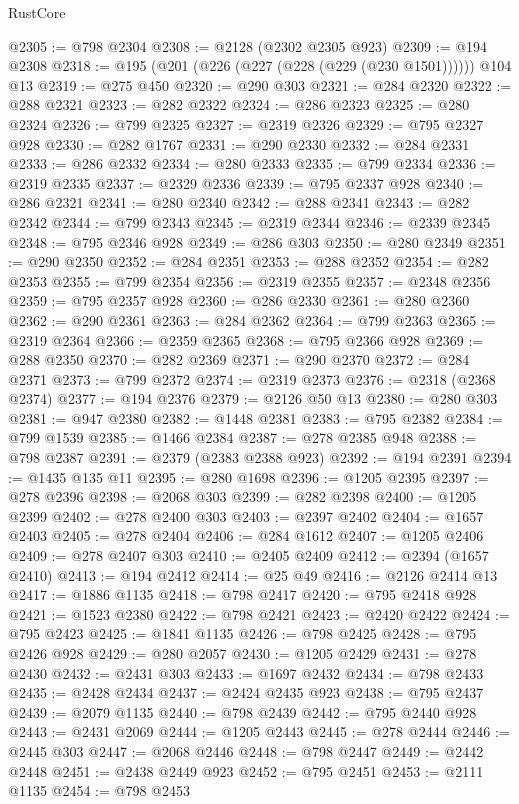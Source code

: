 \begin{lexlean}{RustCore}
\begin{coremodule}
@2305 := @798 @2304
@2308 := @2128 (@2302 @2305 @923)
@2309 := @194 @2308
@2318 := @195 (@201 (@226 (@227 (@228 (@229 (@230 @1501)))))) @104 @13
@2319 := @275 @450
@2320 := @290 @303
@2321 := @284 @2320
@2322 := @288 @2321
@2323 := @282 @2322
@2324 := @286 @2323
@2325 := @280 @2324
@2326 := @799 @2325
@2327 := @2319 @2326
@2329 := @795 @2327 @928
@2330 := @282 @1767
@2331 := @290 @2330
@2332 := @284 @2331
@2333 := @286 @2332
@2334 := @280 @2333
@2335 := @799 @2334
@2336 := @2319 @2335
@2337 := @2329 @2336
@2339 := @795 @2337 @928
@2340 := @286 @2321
@2341 := @280 @2340
@2342 := @288 @2341
@2343 := @282 @2342
@2344 := @799 @2343
@2345 := @2319 @2344
@2346 := @2339 @2345
@2348 := @795 @2346 @928
@2349 := @286 @303
@2350 := @280 @2349
@2351 := @290 @2350
@2352 := @284 @2351
@2353 := @288 @2352
@2354 := @282 @2353
@2355 := @799 @2354
@2356 := @2319 @2355
@2357 := @2348 @2356
@2359 := @795 @2357 @928
@2360 := @286 @2330
@2361 := @280 @2360
@2362 := @290 @2361
@2363 := @284 @2362
@2364 := @799 @2363
@2365 := @2319 @2364
@2366 := @2359 @2365
@2368 := @795 @2366 @928
@2369 := @288 @2350
@2370 := @282 @2369
@2371 := @290 @2370
@2372 := @284 @2371
@2373 := @799 @2372
@2374 := @2319 @2373
@2376 := @2318 (@2368 @2374)
@2377 := @194 @2376
@2379 := @2126 @50 @13
@2380 := @280 @303
@2381 := @947 @2380
@2382 := @1448 @2381
@2383 := @795 @2382
@2384 := @799 @1539
@2385 := @1466 @2384
@2387 := @278 @2385 @948
@2388 := @798 @2387
@2391 := @2379 (@2383 @2388 @923)
@2392 := @194 @2391
@2394 := @1435 @135 @11
@2395 := @280 @1698
@2396 := @1205 @2395
@2397 := @278 @2396
@2398 := @2068 @303
@2399 := @282 @2398
@2400 := @1205 @2399
@2402 := @278 @2400 @303
@2403 := @2397 @2402
@2404 := @1657 @2403
@2405 := @278 @2404
@2406 := @284 @1612
@2407 := @1205 @2406
@2409 := @278 @2407 @303
@2410 := @2405 @2409
@2412 := @2394 (@1657 @2410)
@2413 := @194 @2412
@2414 := @25 @49
@2416 := @2126 @2414 @13
@2417 := @1886 @1135
@2418 := @798 @2417
@2420 := @795 @2418 @928
@2421 := @1523 @2380
@2422 := @798 @2421
@2423 := @2420 @2422
@2424 := @795 @2423
@2425 := @1841 @1135
@2426 := @798 @2425
@2428 := @795 @2426 @928
@2429 := @280 @2057
@2430 := @1205 @2429
@2431 := @278 @2430
@2432 := @2431 @303
@2433 := @1697 @2432
@2434 := @798 @2433
@2435 := @2428 @2434
@2437 := @2424 @2435 @923
@2438 := @795 @2437
@2439 := @2079 @1135
@2440 := @798 @2439
@2442 := @795 @2440 @928
@2443 := @2431 @2069
@2444 := @1205 @2443
@2445 := @278 @2444
@2446 := @2445 @303
@2447 := @2068 @2446
@2448 := @798 @2447
@2449 := @2442 @2448
@2451 := @2438 @2449 @923
@2452 := @795 @2451
@2453 := @2111 @1135
@2454 := @798 @2453

\end{coremodule}
\end{lexlean}
